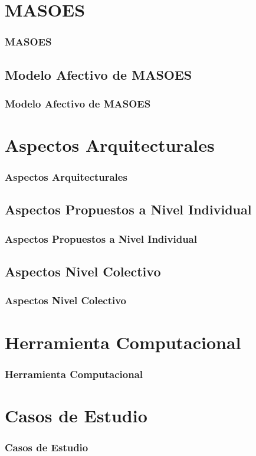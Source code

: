 \documentclass{beamer}
\begin{document}
\section{MASOES}
\begin{frame}
\frametitle{MASOES}

\end{frame}

\subsection{Modelo Afectivo de MASOES}
\begin{frame}
\frametitle{Modelo Afectivo de MASOES}

\end{frame}

\section{Aspectos Arquitecturales}
\begin{frame}
\frametitle{Aspectos Arquitecturales}

\end{frame}

\subsection{Aspectos Propuestos a Nivel Individual}
\begin{frame}
\frametitle{Aspectos Propuestos a Nivel Individual}

\end{frame}

\subsection{Aspectos Nivel Colectivo}
\begin{frame}
\frametitle{Aspectos Nivel Colectivo}

\end{frame}

\section{Herramienta Computacional}
\begin{frame}
\frametitle{Herramienta Computacional}

\end{frame}

\section{Casos de Estudio}
\begin{frame}
\frametitle{Casos de Estudio}

\end{frame}
\end{document}
